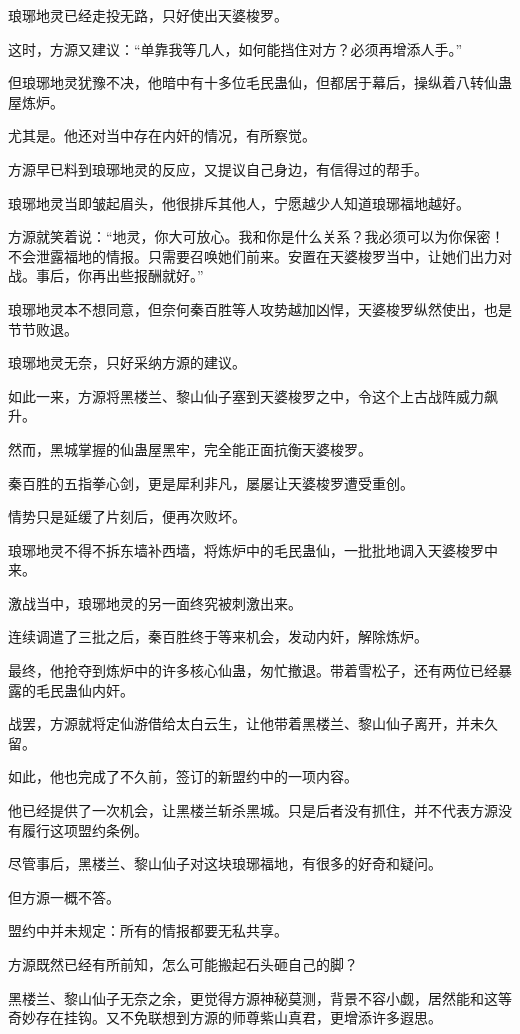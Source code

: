 \begin{this_body}
琅琊地灵已经走投无路，只好使出天婆梭罗。

这时，方源又建议：“单靠我等几人，如何能挡住对方？必须再增添人手。”

但琅琊地灵犹豫不决，他暗中有十多位毛民蛊仙，但都居于幕后，操纵着八转仙蛊屋炼炉。

尤其是。他还对当中存在内奸的情况，有所察觉。

方源早已料到琅琊地灵的反应，又提议自己身边，有信得过的帮手。

琅琊地灵当即皱起眉头，他很排斥其他人，宁愿越少人知道琅琊福地越好。

方源就笑着说：“地灵，你大可放心。我和你是什么关系？我必须可以为你保密！不会泄露福地的情报。只需要召唤她们前来。安置在天婆梭罗当中，让她们出力对战。事后，你再出些报酬就好。”

琅琊地灵本不想同意，但奈何秦百胜等人攻势越加凶悍，天婆梭罗纵然使出，也是节节败退。

琅琊地灵无奈，只好采纳方源的建议。

如此一来，方源将黑楼兰、黎山仙子塞到天婆梭罗之中，令这个上古战阵威力飙升。

然而，黑城掌握的仙蛊屋黑牢，完全能正面抗衡天婆梭罗。

秦百胜的五指拳心剑，更是犀利非凡，屡屡让天婆梭罗遭受重创。

情势只是延缓了片刻后，便再次败坏。

琅琊地灵不得不拆东墙补西墙，将炼炉中的毛民蛊仙，一批批地调入天婆梭罗中来。

激战当中，琅琊地灵的另一面终究被刺激出来。

连续调遣了三批之后，秦百胜终于等来机会，发动内奸，解除炼炉。

最终，他抢夺到炼炉中的许多核心仙蛊，匆忙撤退。带着雪松子，还有两位已经暴露的毛民蛊仙内奸。

战罢，方源就将定仙游借给太白云生，让他带着黑楼兰、黎山仙子离开，并未久留。

如此，他也完成了不久前，签订的新盟约中的一项内容。

他已经提供了一次机会，让黑楼兰斩杀黑城。只是后者没有抓住，并不代表方源没有履行这项盟约条例。

尽管事后，黑楼兰、黎山仙子对这块琅琊福地，有很多的好奇和疑问。

但方源一概不答。

盟约中并未规定：所有的情报都要无私共享。

方源既然已经有所前知，怎么可能搬起石头砸自己的脚？

黑楼兰、黎山仙子无奈之余，更觉得方源神秘莫测，背景不容小觑，居然能和这等奇妙存在挂钩。又不免联想到方源的师尊紫山真君，更增添许多遐思。


\end{this_body}
